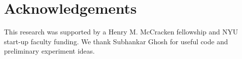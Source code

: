 \section{Acknowledgements}

This research was supported by a Henry M. McCracken fellowship and NYU
start-up faculty funding. We thank Subhankar Ghosh for useful code and
preliminary experiment ideas.